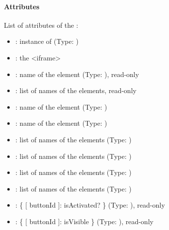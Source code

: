 \documentclass[a4paper,12pt,english]{sphinxmanual}
\begin{document}
\paragraph{Attributes}
\label{\detokenize{viewer/parameters:attributes}}
List of attributes of the :
\begin{itemize}
\item {} 
: instance of  (Type: )

\item {} 
: the  \textless{}iframe\textgreater{}

\item {} 
: name of the element (Type: ), read-only

\item {} 
: list of names of the elements, read-only

\item {} 
: name of the element (Type: )

\item {} 
: name of the element (Type: )

\item {} 
: list of names of the elements (Type: )

\item {} 
: list of names of the elements (Type: )

\item {} 
: list of names of the elements (Type: )

\item {} 
: list of names of the elements (Type: )

\item {} 
: \{ {[} buttonId {]}:  isActivated?  \} (Type: ), read-only

\item {} 
: \{ {[} buttonId {]}:  isVisible \} (Type: ), read-only

\end{itemize}
\end{document}
